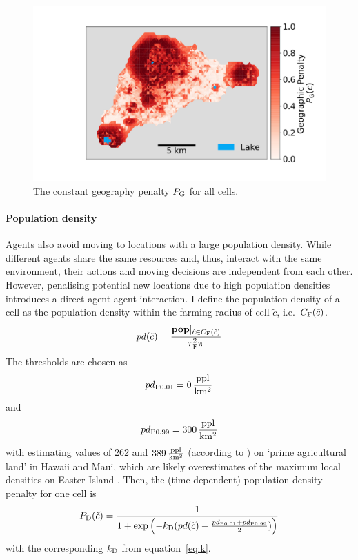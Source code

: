 \begin{figure}
	\centering
	\includegraphics[width=1\linewidth]{images/Plot_PG}
	\caption{The constant geography penalty $P_{\rm G}$ for all cells.}
	\label{fig:P_G}
\end{figure}

\paragraph{Population density} %
Agents also avoid moving to locations with a large population density.
While different agents share the same resources and, thus, interact with the same environment, their actions and moving decisions are independent from each other. 
However, penalising potential new locations due to high population densities introduces a direct agent-agent interaction. 
I define the population density of a cell as the population density within the farming radius of cell $\tilde{c}$, i.e.\ $C_{\rm F}(\tilde{c})$.
\begin{equation}
pd (\tilde{c}) = \frac{\mathbf{pop}|_{\hat{c} \in C_{\rm F}(\tilde{c}) }}{r_{\rm F}^2 \pi}
\end{equation}
The thresholds are chosen as
\begin{equation}
pd_{\rm P0.01} = 0 \, {\rm \frac{ppl}{km^2}}
\end{equation}
and 
\begin{equation}
pd_{\rm P0.99} = 300 \, {\rm \frac{ppl}{km^2}}
\end{equation}
with \citet{Kirch2010} estimating values of $262$ and $389\, {\rm \frac{ppl}{km^2}}$ (according to \citet{Puleston2017}) on `prime agricultural land' in Hawaii and Maui, which are likely overestimates of the maximum local densities on Easter Island \citep{Puleston2017}. %
Then, the (time dependent) population density penalty for one cell is
\begin{equation}
P_{\rm D}(\tilde{c}) = \frac{1}{1+\exp\left( - k_{\rm D} (pd(\tilde{c})-\frac{pd_{\rm P0.01} + pd_{\rm P0.99}}{2}) \right)}
\end{equation}
with the corresponding $k_{\rm D}$ from equation~\ref{eq:k}.
		

